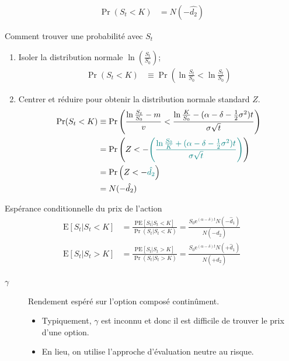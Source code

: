 \documentclass[10pt, french]{article}
\begin{document}
\begin{multicols*}{2}
\begin{distributions}
\begin{align*}
	\Pr(S_{t} < K) 
	&=	N(-\hat{d_{2}})
\end{align*}
\end{distributions}

\begin{algo}{Comment trouver une probabilité avec $S_{t}$}
\begin{enumerate}[leftmargin = *]
	\item	Isoler la distribution normale $\ln\left(\frac{S_{t}}{S_{0}}\right)$;
		\begin{align*}
		\Pr(S_{t} < K)
		&\equiv	\Pr\left( \ln\frac{S_{t}}{S_{0}} < \ln\frac{S_{t}}{S_{0}} \right)
		\end{align*}
	\item	Centrer et réduire pour obtenir la distribution normale standard $Z$.
		\begin{align*}
		\Pr(S_{t} < K)
		&\equiv	\Pr\left( \frac{\ln\frac{S_{t}}{S_{0}} - m}{v} < \frac{\ln\frac{K}{S_{0}} - (\alpha - \delta - \frac{1}{2}\sigma^{2})t}{\sigma\sqrt{t}}\right)	\\
		&=	\Pr\left( Z < - {\color{teal}\left(
				\frac{\ln\frac{S_{0}}{K} + (\alpha - \delta - \frac{1}{2}\sigma^{2})t}{\sigma\sqrt{t}}\right)}
				\right)	\\
		&=	\Pr\left( Z < - {\color{teal}\hat{d_{2}}}\right)	\\
		&=	N(-\hat{d_{2}})
		\end{align*}
\end{enumerate}
\end{algo}

\begin{conceptgen}{Espérance conditionnelle du prix de l'action}
\begin{align*}
	\text{E}[S_{t} | S_{t} < K]
	&=	\frac{\text{PE}[S_{t} | S_{t} < K]}{\Pr(S_{t} | S_{t} < K)}
	=	\frac{S_{0}\textrm{e}^{(\alpha - \delta)t}N(-\hat{d}_{1})}{N(-\hat{d}_{2})}	\\
	\text{E}[S_{t} | S_{t} > K]
	&=	\frac{\text{PE}[S_{t} | S_{t} > K]}{\Pr(S_{t} | S_{t} > K)}
	=	\frac{S_{0}\textrm{e}^{(\alpha - \delta)t}N(+\hat{d}_{1})}{N(+\hat{d}_{2})}
\end{align*}
\end{conceptgen}

\begin{distributions}[Notation]
\begin{description}
	\item[$\gamma$]	Rendement espéré sur l'option composé continûment.
		\begin{itemize}[leftmargin = *]
		\item	Typiquement, $\gamma$ est inconnu et donc il est difficile de trouver le prix d'une option.
		\item	En lieu, on utilise l'approche d'évaluation neutre au risque.
		\end{itemize}
\end{description}
\end{distributions}


\end{multicols*}
\end{document}
